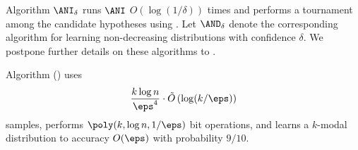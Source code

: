%

%
Algorithm
$\ANI_{\delta}$ runs $\ANI$ $O(\log(1/\delta))$ times
and performs a tournament among the candidate hypotheses using
.
Let $\AND_{\delta}$ denote the corresponding  algorithm for learning
non-decreasing distributions with confidence $\delta$.
We postpone further details on these algorithms to
. 


\begin{theorem} \label{thm:correctness-learn-simple}
%
Algorithm
{\hyperref[alg:learn-kmodal-simple]{}}
%
 ()
%
uses
\[
\frac{k \log n}{\eps^4} \cdot \tilde{O}\left( \log (k/\eps)
  \right)
\]
samples,
performs
$\poly(k, \log n, 1/\eps)$ bit operations,
and learns a $k$-modal distribution to accuracy $O(\eps)$ with probability $9/10$.
\end{theorem}




